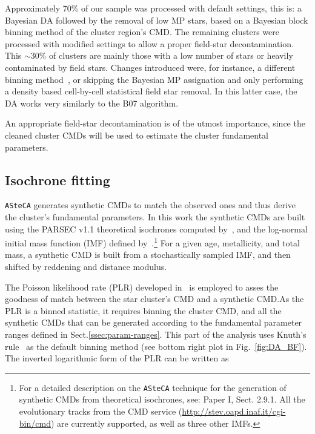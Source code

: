 \documentclass{aa}
\begin{document}
Approximately 70\% of our sample was processed with default settings, this is: a
Bayesian DA followed by the removal of low MP stars, based on a Bayesian block
binning method of the cluster region's CMD.\@
%
The remaining clusters were processed with modified settings to allow a proper
field-star decontamination. This ${\sim}$30\% of clusters are mainly those with
a low number of stars or heavily contaminated by field stars.
Changes introduced were, for instance, a different binning
method~\citep[often a rectangular grid using Scott's rule,][]{Scott_1979},
or skipping the Bayesian MP assignation and only performing a density based
cell-by-cell statistical field star removal. In this latter case, the DA works
very similarly to the B07 algorithm.

An appropriate field-star decontamination is of the utmost importance, since the
cleaned cluster CMDs will be used to estimate the cluster fundamental parameters.



\subsection{Isochrone fitting}
\label{ssec:isoch-fit}

\texttt{ASteCA} generates synthetic CMDs to match the observed ones and thus
derive the cluster's fundamental parameters. In this work the synthetic CMDs are
built using the PARSEC v1.1 theoretical isochrones computed
by~\citet[][B12]{Bressan_2012}, and the log-normal initial mass function (IMF)
defined by~\cite{Chabrier_2001}.\footnote{For a detailed description on the
\texttt{ASteCA} technique for the generation of synthetic CMDs from
theoretical isochrones, see: Paper I, Sect. 2.9.1. All the evolutionary tracks
from the CMD service (\url{http://stev.oapd.inaf.it/cgi-bin/cmd}) are currently
supported, as well as three other IMFs.}
For a given age, metallicity, and total mass, a synthetic CMD is built
from a stochastically sampled IMF, and then shifted by reddening and distance
modulus.

The Poisson likelihood rate (PLR) developed in~\cite{Dolphin_2002} is employed
to asses the goodness of match between the star cluster's CMD and a synthetic
CMD.\@ As the PLR is a binned statistic, it requires binning the cluster CMD,
and all the synthetic CMDs that can be generated according to the fundamental
parameter ranges defined in Sect.\ref{ssec:param-ranges}.
This part of the analysis uses Knuth's rule~\citep[][also implemented via the
astroML package]{Knuth_2006} as the default binning method (see bottom right
plot in Fig.~\ref{fig:DA_BF}).
%
The inverted logarithmic form of the PLR can be written as
\end{document}
